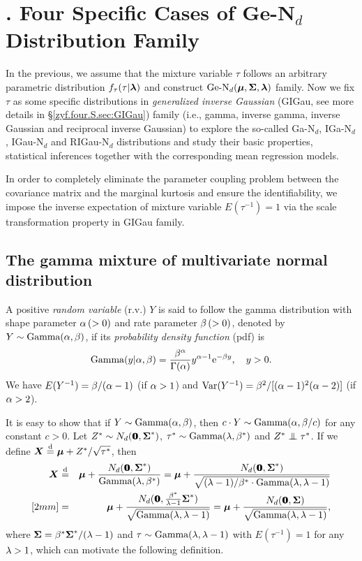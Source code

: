 \section{$\!\!\!\!\!\!\!$. Four Specific Cases of Ge-N$_d$ Distribution Family}    %

In the previous, we assume that the mixture variable $\tau$ follows an arbitrary parametric distribution $f_\tau(\tau|{\boldsymbol{\lambda}})$ and construct $\mbox{Ge-N}_d({\boldsymbol{\mu}}, {\mbox{\boldmath$\Sigma$}}, {\boldsymbol{\lambda}})$ family. Now we fix $\tau$ as some specific distributions in \textit{generalized inverse Gaussian} (GIGau, see more details in \S\ref{zyf.four.S.sec:GIGau}) family (i.e., gamma, inverse gamma, inverse Gaussian and reciprocal inverse Gaussian) to explore the so-called Ga-N$_d$, IGa-N$_d$, IGau-N$_d$ and RIGau-N$_d$ distributions and study their basic properties, statistical inferences together with the corresponding mean regression models.

In order to completely eliminate the parameter coupling problem between the covariance matrix and the marginal kurtosis and ensure the identifiability, we impose the inverse expectation of mixture variable $E(\tau^{-1}) = 1$ via the scale transformation property in GIGau family.

\subsection{The gamma mixture of multivariate normal distribution}       %

A positive \textit{random variable} (r.v.) $Y$ is said to follow the gamma distribution with shape parameter $\alpha \, (>0)$ and rate parameter $\beta \, (>0)$, denoted by $Y \sim \mbox{Gamma}(\alpha, \beta)$, if its \textit{probability density function} (pdf) is
\begin{eqnarray*}
    \mbox{Gamma}(y | \alpha, \beta) = \frac{\beta^\alpha}{\Gamma(\alpha)} y^{\alpha - 1} {\rm e}^{-\beta y}, \quad y > 0.
\end{eqnarray*}
We have $E(Y^{-1}) = \beta / (\alpha - 1)$ (if $\alpha > 1$) and $\mbox{Var}(Y^{-1}) = \beta^2 / [(\alpha - 1)^2 (\alpha - 2)]$ (if $\alpha > 2$). 

It is easy to show that if $Y \sim \mbox{Gamma}(\alpha, \beta)$, then $c \cdot Y \sim \mbox{Gamma}(\alpha, \beta/c)$ for any constant $c > 0$. Let $Z^* \sim N_d({\bf 0}\!\!\!{\bf 0}, {\mbox{\boldmath$\Sigma$}}^*)$, $\tau^* \sim \mbox{Gamma}(\lambda, \beta^*)$ and $Z^* \inde \tau^*$. If we define ${\boldsymbol{X}} \stackrel{{\rm d}}{=} {\boldsymbol{\mu}} + Z^* / \sqrt{\tau^*}$, then
\begin{eqnarray*}
    \ibX &\sd& \bmu + \frac{N_d(\0, \bSi^*)}{\mGamma(\la, \be^*)} = \bmu + \frac{N_d(\0, \bSi^*)}{\sqrt{(\la - 1) / \be^* \cdot \mGamma(\la, \la - 1)}} \\ [2mm]
    &=& \bmu + \frac{N_d(\0, \frac{\be^*}{\la - 1} \bSi^*)}{\sqrt{\mGamma(\la, \la - 1)}} = \bmu + \frac{N_d(\0, \bSi)}{\sqrt{\mGamma(\la, \la - 1)}},
\end{eqnarray*}
where ${\mbox{\boldmath$\Sigma$}} = \beta^* {\mbox{\boldmath$\Sigma$}}^* / (\lambda - 1)$ and $\tau \sim \mbox{Gamma}(\lambda, \lambda - 1)$ with $E(\tau^{-1}) = 1$ for any $\lambda > 1$, which can motivate the following definition.

